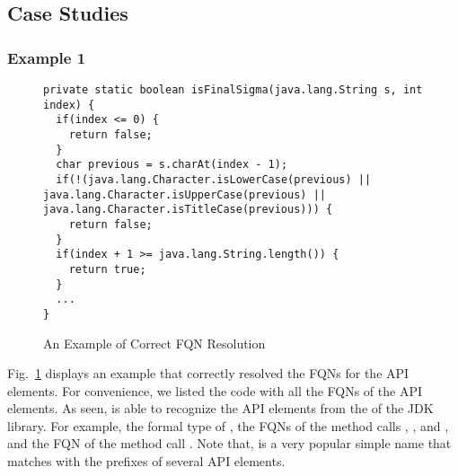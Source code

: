 \subsection{Case Studies}

\subsubsection{Example 1}

\begin{figure}[t]
	\centering
\begin{lstlisting}[]
private static boolean isFinalSigma(java.lang.String s, int index) {
  if(index <= 0) {
    return false;
  }
  char previous = s.charAt(index - 1);
  if(!(java.lang.Character.isLowerCase(previous) || java.lang.Character.isUpperCase(previous) || java.lang.Character.isTitleCase(previous))) {
    return false;
  }
  if(index + 1 >= java.lang.String.length()) {
    return true;
  }
  ...
}
\end{lstlisting}
        \vspace{-12pt}
        \caption{An Example of Correct FQN Resolution}
        \label{fig:ex1}
\end{figure}

Fig.~\ref{fig:ex1} displays an example that {\tool} correctly resolved
the FQNs for the API elements. For convenience, we listed the code
with all the FQNs of the API elements. As seen, {\tool} is able to
recognize the API elements from the  of the JDK
library. For example, the formal type  of , the
FQNs of the method calls , , and
, and the FQN of the method call .
Note that,  is a very popular simple name that matches
with the prefixes of several API elements.


